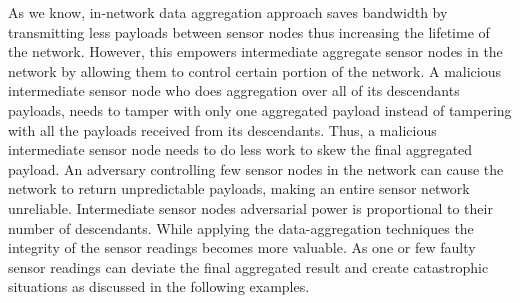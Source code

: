 	As we know, in-network data aggregation approach saves bandwidth by transmitting less payloads between sensor nodes thus increasing the lifetime of the network.
	However, this empowers intermediate aggregate sensor nodes in the network by allowing them to control certain portion of the network.
	A malicious intermediate sensor node who does aggregation over all of its descendants payloads, needs to tamper with only one aggregated payload instead of tampering with all the payloads received from its descendants. 
	Thus, a malicious intermediate sensor node needs to do less work to skew the final aggregated payload.
	An adversary controlling few sensor nodes in the network can cause the network to return unpredictable payloads, making an entire sensor network unreliable.
	Intermediate sensor nodes adversarial power is proportional to their number of descendants.
	While applying the data-aggregation techniques the integrity of the sensor readings becomes more valuable.
	As one or few faulty sensor readings can deviate the final aggregated result and create catastrophic situations as discussed in the following examples.

		



